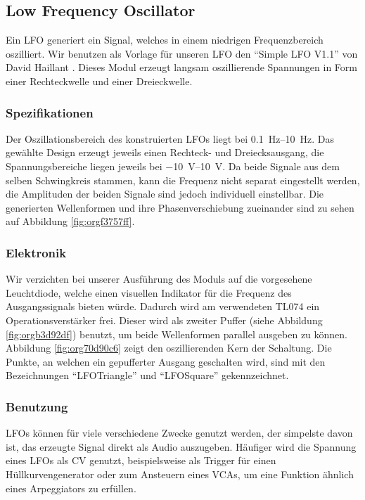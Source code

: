\newpage
\subsection{Low Frequency Oscillator \label{LFO}}
\label{sec:org94a5700}

Ein \ac{LFO} generiert ein Signal, welches in einem niedrigen Frequenzbereich oszilliert. Wir benutzen als Vorlage für unseren \ac{LFO} den "`Simple LFO V1.1"' von David Haillant \cite{haillant:lfo}. Dieses Modul erzeugt langsam oszillierende Spannungen in Form einer Rechteckwelle und einer Dreieckwelle.

\subsubsection{Spezifikationen}
\label{sec:org0cffd87}
Der Oszillationsbereich des konstruierten \ac{LFO}s liegt bei \SIrange{0.1}{10}{\hertz}. Das gewählte Design erzeugt jeweils einen Rechteck- und Dreiecksausgang, die Spannungsbereiche liegen jeweils bei \SIrange{-10}{10}{\volt}. Da beide Signale aus dem selben Schwingkreis stammen, kann die Frequenz nicht separat eingestellt werden, die Amplituden der beiden Signale sind jedoch individuell einstellbar. Die generierten Wellenformen und ihre Phasenverschiebung zueinander sind zu sehen auf Abbildung \ref{fig:orgf3757ff}.

\subsubsection{Elektronik}
\label{sec:org9ddbba2}
Wir verzichten bei unserer Ausführung des Moduls auf die vorgesehene Leuchtdiode, welche einen visuellen Indikator für die Frequenz des Ausgangssignals bieten würde. Dadurch wird am verwendeten TL074 ein Operationsverstärker frei. Dieser wird als zweiter Puffer (siehe Abbildung \ref{fig:orgb3d92df}) benutzt, um beide Wellenformen parallel ausgeben zu können. Abbildung \ref{fig:org70d90c6} zeigt den oszillierenden Kern der Schaltung. Die Punkte, an welchen ein gepufferter Ausgang geschalten wird, sind mit den Bezeichnungen "`LFO\textunderscore Triangle"' und "`LFO\textunderscore Square"' gekennzeichnet.

\newpage

\subsubsection{Benutzung}
\label{sec:org5b3f84c}
\acp{LFO} können für viele verschiedene Zwecke genutzt werden, der simpelste davon ist, das erzeugte Signal direkt als Audio auszugeben. Häufiger wird die Spannung eines \ac{LFO}s als \acl{CV} genutzt, beispielsweise als Trigger für einen Hüllkurvengenerator oder zum Ansteuern eines \acp{VCA}, um eine Funktion ähnlich eines Arpeggiators zu erfüllen.

